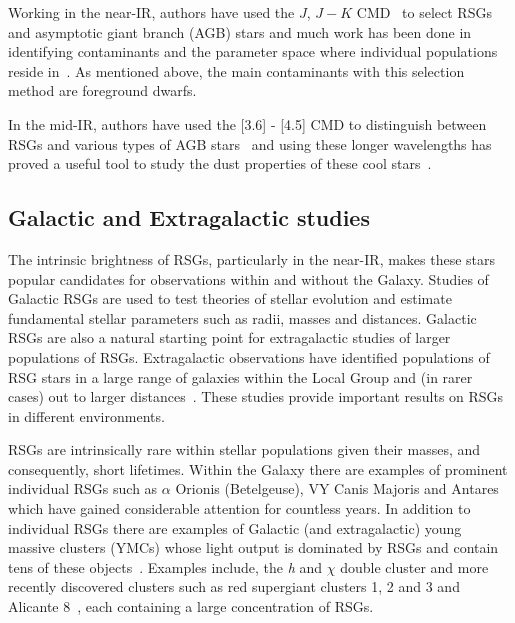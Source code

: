 Working in the near-IR, authors have used the $J$, $J-K$ CMD~\citep[e.g.][]{2000ApJ...542..804N,2006A&A...452..195C,Neugent12,2015ApJ...803...14P} to select RSGs and asymptotic giant branch (AGB) stars and much work has been done in identifying contaminants and the parameter space where individual populations reside in~\citep{2006A&A...452..195C}.
As mentioned above, the main contaminants with this selection method are foreground dwarfs.

In the mid-IR, authors have used the [3.6] - [4.5] CMD to distinguish between RSGs and various types of AGB stars~\citep{2006AJ....132.2034B,2014A&A...562A..75B,2015A&A...584A..33B,2015ApJ...800...51B,2015A&A...578A.100W} and using these longer wavelengths has proved a useful tool to study the dust properties of these cool stars~\citep{Beasor-prep}.



\subsection{Galactic and Extragalactic studies} %
\label{sub:galactic_and_extragalactic}

The intrinsic brightness of RSGs, particularly in the near-IR, makes these stars popular candidates for observations within and without the Galaxy.
Studies of Galactic RSGs are used to test theories of stellar evolution and estimate fundamental stellar parameters such as radii, masses and distances.
Galactic RSGs are also a natural starting point for extragalactic studies of larger populations of RSGs.
Extragalactic observations have identified populations of RSG stars in a large range of galaxies within the Local Group and (in rarer cases) out to larger distances~\citep[e.g.][and see Chapter~\ref{ch:ngc55}]{Elias85,Humphreys86, Massey06, 2007AJ....134.2474M, Groenewegen09,Massey13,2015ApJ...805..182G}.
These studies provide important results on RSGs in different environments.


RSGs are intrinsically rare within stellar populations given their masses, and consequently, short lifetimes.
Within the Galaxy there are examples of prominent individual RSGs such as $\alpha$ Orionis (Betelgeuse), VY Canis Majoris and Antares which have gained considerable attention for countless years.\footnotemark
In addition to individual RSGs there are examples of Galactic (and extragalactic) young massive clusters (YMCs) whose light output is dominated by RSGs and contain tens of these objects~\citep{2014ApJ...788...58G}.
Examples include, the {\it h} and $\chi$ double cluster and more recently discovered clusters such as  red supergiant clusters 1, 2 and 3 and Alicante 8~\citep[RSGC01, RSGC02, RSGC03;][respectively; \citealt{2010A&A...513A..74N}]{2006ApJ...643.1166F,2007ApJ...671..781D,2009A&A...498..109C}, each containing a large concentration of RSGs.

